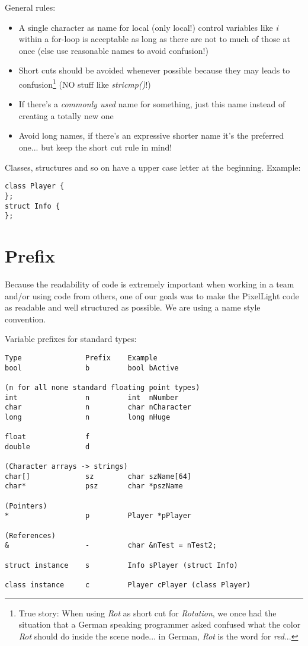 General rules:

\begin{itemize}
\item A single character as name for local (only local!) control variables like \emph{i} within a for-loop is acceptable as long as there are not to much of those at once (else use reasonable names to avoid confusion!)
\item Short cuts should be avoided whenever possible because they may leads to confusion\footnote{True story: When using \emph{Rot} as short cut for \emph{Rotation}, we once had the situation that a German speaking programmer asked confused what the color \emph{Rot} should do inside the scene node... in German, \emph{Rot} is the word for \emph{red}...} (NO stuff like \emph{stricmp()}!)
\item If there's a \emph{commonly used} name for something, just this name instead of creating a totally new one
\item Avoid long names, if there's an expressive shorter name it's the preferred one... but keep the short cut rule in mind!
\end{itemize}

Classes, structures and so on have a upper case letter at the beginning. Example:

\begin{lstlisting}[caption=Name convention]
class Player {
};
struct Info {
};
\end{lstlisting}




\section{Prefix}
Because the readability of code is extremely important when working in a team and/or using code from others, one of our goals was to make the PixelLight code as readable and well structured as possible. We are using a name style convention.

Variable prefixes for standard types:

\begin{lstlisting}[caption=Variable prefixes for standard types]
Type               Prefix    Example
bool               b         bool bActive

(n for all none standard floating point types)
int                n         int  nNumber
char               n         char nCharacter
long               n         long nHuge

float              f
double             d

(Character arrays -> strings)
char[]             sz        char szName[64]
char*              psz       char *pszName

(Pointers)
*                  p         Player *pPlayer

(References)
&                  -         char &nTest = nTest2;

struct instance    s         Info sPlayer (struct Info)

class instance     c         Player cPlayer (class Player)
\end{lstlisting}

